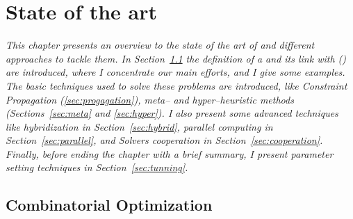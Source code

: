 \chapter{State of the art}
\label{chap:art}
\textit{This chapter presents an overview to the state of the art of \COPs{} and different approaches to tackle them. In Section~\ref{sec:combi} the definition of a \COP{} and its link with \CSPs{} (\csp) are introduced, where I concentrate our main efforts, and I give some examples. The basic techniques used to solve these problems are introduced, like {\it Constraint Propagation} (\ref{sec:progagation}), {\it meta-- and hyper--heuristic methods} (Sections~\ref{sec:meta} and \ref{sec:hyper}). I also present some advanced techniques like {\it hybridization} in Section~\ref{sec:hybrid}, {\it parallel computing} in Section~\ref{sec:parallel}, and {\it Solvers cooperation} in Section~\ref{sec:cooperation}. Finally, before ending the chapter with a brief summary,  I present {\it parameter setting techniques} in Section~\ref{sec:tunning}.}
\vfill
\minitoc
\newpage



\section{Combinatorial Optimization}
\label{sec:combi}

